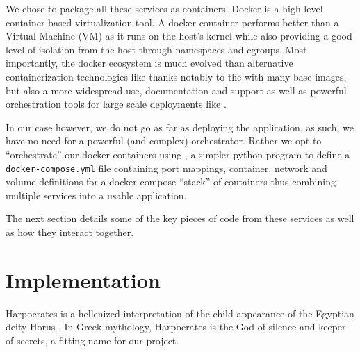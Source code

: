 \documentclass[\version]{l4proj}
\begin{document}
We chose to package all these services as \textcite{Docker2020} containers.
Docker is a high level container-based virtualization tool.
A docker container performs better than a Virtual Machine (VM) as it runs on the host's kernel while also providing a good level of isolation from the host through namespaces and cgroups.
Most importantly, the docker ecosystem is much evolved than alternative containerization technologies like \textcite{Lxc2020} thanks notably to the \textcite{DockerHub} with many base images, but also a more widespread use, documentation and support as well as powerful orchestration tools for large scale deployments like \textcite{Kubernetes2020}.

In our case however, we do not go as far as deploying the application, as such, we have no need for a powerful (and complex) orchestrator.
Rather we opt to ``orchestrate'' our docker containers using \textcite{DockerCompose2020}, a simpler python program to define a \verb|docker-compose.yml| file containing port mappings, container, network and volume definitions for a docker-compose ``stack'' of containers thus combining multiple services into a usable application.

The next section details some of the key pieces of code from these services as well as how they interact together.


\chapter{Implementation}

Harpocrates is a hellenized interpretation of the child appearance of the Egyptian deity Horus \autocite{mattheyChutSigneHarpocrate2011}.
In Greek mythology, Harpocrates is the God of silence and keeper of secrets, a fitting name for our project.
\end{document}
